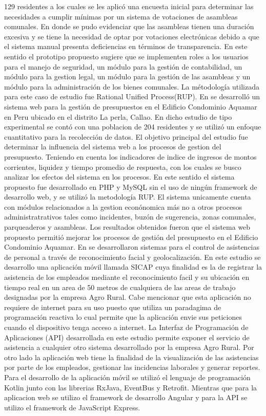 129 residentes a los cuales se les aplicó una encuesta inicial para determinar las necesidades a cumplir mínimas por un sistema de votaciones de asambleas comunales.
En donde se pudo evidenciar que las asambleas tienen una duración excesiva y se tiene la necesidad de optar por votaciones electrónicas debido a que el sistema manual presenta deficiencias en términos de transparencia.
En este sentido el prototipo propuesto sugiere que se implementen roles a los usuarios para el manejo de seguridad, un módulo para la gestión de contabilidad, un módulo para la gestion legal, un módulo para la gestión de las asambleas y un módulo para la administración de los bienes comunales. La métodología utilizada para este caso de estudio fue Rational Unified Process(RUP).
\bigbreak
En\cite{moscayzaSistemaWebPara} se desarrolló un sistema web para la gestión de presupuestos en el Edificio Condominio Aquamar en Peru ubicado en el distrito La perla, Callao. En dicho estudio de tipo experimental se contó con una poblacion de 204 residentes y se utilizó un enfoque cuantitativo para la recolección de datos. El objetivo principal del estudio fue determinar la influencia del sistema web a los procesos de gestion del presupuesto. Teniendo en cuenta los indicadores de indice de ingresos de montos corrientes, liquidez y tiempo promedio de respuesta, con los cuales se busco analizar los efectos del sistema en los procesos. En este sentido el sistema propuesto fue desarrollado en PHP y MySQL sin el uso de ningún framework de desarrollo web, y se utilizó la metodología RUP. El sistema unicamente cuenta con módulos relacionados a la gestion econónomica más no a otros procesos administratrativos tales como incidentes, buzón de sugerencia, zonas comunales, parqueaderos y asambleas. Los resultados obtenidos fueron que el sistema web propuesto permitió mejorar los procesos de gestión del presupuesto en el Edificio Condominio Aquamar.
\bigbreak
En\cite{leonardoMejoraControlAsistencia2019} se desarrollaron sistemas para el control de asistencias de personal a través de reconocimiento facial y geolocalización. En este estudio se desarrollo una aplicación móvil llamada SICAP cuya finalidad es la de registrar la asistencia de los empleados mediante el reconocimiento facil y su ubicación en tiempo real en un area de 50 metros de cualquiera de las areas de trabajo designadas por la empresa Agro Rural. Cabe mencionar que esta aplicación no requiere de internet para su uso puesto que utiliza un paradagima de programación reactiva lo cual permite que la aplicación envie sus peticiones cuando el dispositivo tenga acceso a internet. La Interfaz de Programación de Aplicaciones (API) desarrollada en este estudio permite exponer el servicio de asistencia a cualquier otro sistema desarrollado por la empresa Agro Rural. Por otro lado la aplicación web tiene la finalidad de la visualización de las asistencias por parte de los empleados, gestionar las incidencias laborales y generar reportes. Para el desarrollo de la aplicación móvil se utilizó el lenguaje de programación Kotlin junto con las librerias RxJava, EventBus y Retrofit. Mientras que para la aplicacion web se utilizo el framework de desarrollo Angular y para la API se utilizo el framework de JavaScript Express.
